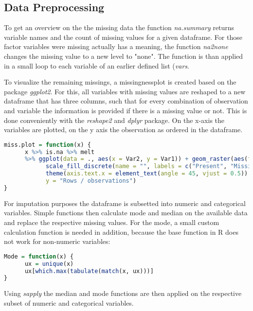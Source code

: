 \subsection{Data Preprocessing}

To  get an overview on the  the missing data the  function \textit{na.summary} returns variable names and the count of missing values for a given dataframe. 
For those factor variables were missing actually has a meaning, the function \textit{na2none} changes the missing value to a new level to "none". The function is than applied in a small loop to each variable of an earlier defined list (\textit{vars}. 

To visualize the remaining missings, a  missingnessplot  is created based on the package \textit{ggplot2}. For this, all variables with missing values are reshaped to a new dataframe that has three columns, such that for every combination of observation and variable the information is provided if there is a missing value or not. This is done conveniently with the \textit{reshape2} and \textit{dplyr} package.  
On the x-axis the variables are plotted, on the y axis the observation as ordered in the dataframe.

\begin{lstlisting}[language=R]
miss.plot = function(x) {
      x %>% is.na %>% melt 
      %>% ggplot(data = ., aes(x = Var2, y = Var1)) + geom_raster(aes(fill = value)) + 
            scale_fill_discrete(name = "", labels = c("Present", "Missing")) + theme_classic() + 
            theme(axis.text.x = element_text(angle = 45, vjust = 0.5)) + labs(x = "Variables in Dataset", 
            y = "Rows / observations")
}
\end{lstlisting}

For imputation purposes the dataframe is subsetted into numeric and categorical variables. 
Simple functions then calculate mode and median on the available data and replace the respective missing values.
For the mode, a small custom calculation function is needed in addition, because the base function in R does not work for non-numeric variables: 
\begin{lstlisting}[language=R]
Mode = function(x) {
      ux = unique(x)
      ux[which.max(tabulate(match(x, ux)))]
}
\end{lstlisting}
Using \textit{sapply} the median and mode functions are then applied on the respective subset of numeric and categorical variables. 

